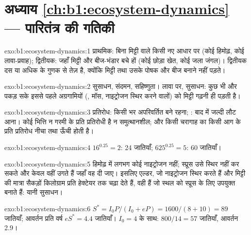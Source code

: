 \section*{अध्याय \ref{ch:b1:ecosystem-dynamics} --- पारितंत्र की गतिकी}

\begin{solution}{exo:b1:ecosystem-dynamics:1}
प्राथमिक: बिना मिट्टी वाले किसी नए आधार पर (कोई हिमोढ़, कोई लावा-प्रवाह);
द्वितीयक: जहाँ मिट्टी और बीज-भंडार बचे हों (कोई छोड़ा खेत, कोई
जला जंगल)। द्वितीयक दस या अधिक के गुणक से तेज़ है, क्योंकि
मिट्टी तथा उसके पोषक और बीज बनाने नहीं पड़ते।
\end{solution}

\begin{solution}{exo:b1:ecosystem-dynamics:2}
सुसाधन, संदमन, सहिष्णुता। लावा पर, सुसाधन: कुछ भी और  पकड़ सके इससे
पहले अग्रगामियों (, मॉस, नाइट्रोजन स्थिर करने वालों) को मिट्टी गढ़नी
ही पड़ती है।
\end{solution}

\begin{solution}{exo:b1:ecosystem-dynamics:3}
प्रतिरोध: किसी  भर अपरिवर्तित बने रहना; :
बाद में जल्दी लौट आना। कोई भित्ति न गरमी के प्रति प्रतिरोधी है
न समुत्थानशील; और किसी चरागाह का किसी आग के प्रति प्रतिरोध नीचा तथा
 ऊँची होती है।
\end{solution}

\begin{solution}{exo:b1:ecosystem-dynamics:4}
$16^{0.25} = 2$: \num{24} जातियाँ; $625^{0.25} = 5$: \num{60} जातियाँ।
\end{solution}

\begin{solution}{exo:b1:ecosystem-dynamics:5}
हिमोढ़ में लगभग कोई नाइट्रोजन नहीं; स्प्रूस उसे स्थिर नहीं कर सकते और
केवल वहीं उगते हैं जहाँ वह दी जाए। इसलिए एल्डर, जो नाइट्रोजन स्थिर करते
हैं और मिट्टी की मात्रा सैकड़ों किलोग्राम प्रति हेक्टेयर तक चढ़ा देते हैं,
वही हैं जो स्थल को स्प्रूस के लिए उपयुक्त बनाते हैं: यानी सुसाधन।
\end{solution}

\begin{solution}{exo:b1:ecosystem-dynamics:6}
$S^* = I_0 P/(I_0 + eP) = 1600/(8 + 10) = 89$ जातियाँ; आवर्तन
प्रति वर्ष $eS^* = 4.4$ जातियाँ। $I_0 = 4$ के साथ: $800/14 = 57$ जातियाँ,
आवर्तन \num{2.9}।
\end{solution}

